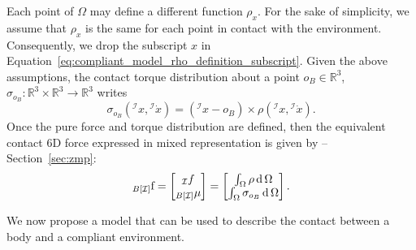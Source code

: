 Each point of $\Omega$ may define a different function $\rho_x$. For the sake of simplicity, we assume that $\rho_x$ is the same for each point in contact with the environment. Consequently, we drop the subscript $x$ in Equation~\eqref{eq:compliant_model_rho_definition_subscript}. 
Given the above assumptions, the contact torque distribution about a point $o_B \in \mathbb{R}^3$, $\sigma_{o_B} : \mathbb{R}^3 \times \mathbb{R}^3  \rightarrow \mathbb{R}^3$ writes
    \begin{equation}
        \sigma_{o_B}\left({}^\mathcal{I}x, {}^\mathcal{I} \dot{x}\right) = \left({}^\mathcal{I}x - o_B\right)\times \rho\left({}^\mathcal{I}x, {}^\mathcal{I} \dot{x}\right).
    \end{equation}
Once the pure force and torque distribution are defined, then the equivalent contact 6D force expressed in mixed representation is given by \citep{Caron2015StabilityAreas} -- Section~\ref{sec:zmp}:
\begin{equation}
\label{eq:compliant-contact-contact-wrench}
    {}_{B[\mathcal{I}]} \mathrm{f} = \begin{bmatrix}
    {}_\mathcal{I} f \\
    {}_{B[\mathcal{I}]} \mu
    \end{bmatrix} = 
    \begin{bmatrix}
    \int_\Omega \rho \operatorname{d} \Omega \\
    \int_\Omega \sigma_{o_B} \operatorname{d} \Omega \\
    \end{bmatrix}.
\end{equation}
\par
We now propose a model that can be used to describe the contact between a body and a compliant environment.
